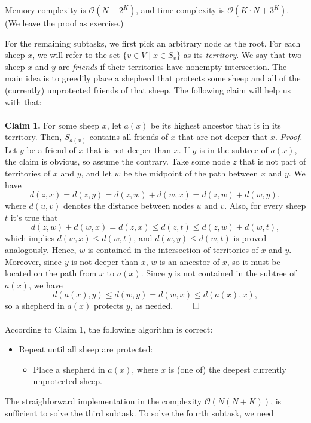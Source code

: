 Memory complexity is $\mathcal{O}(N + 2^K)$, and time complexity is 
$\mathcal{O}(K \cdot N + 3^K)$. (We leave the proof as exercise.) 


For the remaining subtasks, we first pick an arbitrary node as the root.
For each sheep $x$, we will refer to the set $\{v \in V \mid x \in S_v\}$ as its
\textit{territory}. We say that two sheep $x$ and $y$ are \textit{friends} if
their territories have nonempty intersection. The main idea is to greedily place
a shepherd that protects some sheep and all of the (currently) unprotected friends
of that sheep. The following claim will help us with that:
\\\\
\textbf{Claim 1.} For some sheep $x$, let $a(x)$ be its highest ancestor that
is in its territory. Then, $S_{a(x)}$ contains all friends of $x$ that are not
deeper that $x$.
\textit{Proof.} Let $y$ be a friend of $x$ that is not deeper than $x$. If $y$
is in the subtree of $a(x)$, the claim is obvious, so assume the contrary. Take
some node $z$ that is not part of territories of $x$ and $y$, and let $w$ be the
midpoint of the path between $x$ and $y$. We have
$$d(z, x) = d(z, y) = d(z, w) + d(w, x) = d(z, w) + d(w, y),$$ where $d(u, v)$
denotes the distance between nodes $u$ and $v$. Also, for every sheep $t$ it's
true that 
$$d(z, w) + d(w, x) = d(z, x) \leq d(z, t) \leq d(z, w) + d(w, t),$$ which
implies
$d(w, x) \leq d(w, t)$, and $d(w, y) \leq d(w, t)$ is proved analogously.
Hence, $w$ is contained in the intersection of territories of $x$ and $y$.
Moreover, since $y$ is not deeper than $x$, $w$ is an ancestor of $x$, so it
must be located on the path from $x$ to $a(x)$. Since $y$ is not contained in
the subtree of $a(x)$, we have $$d(a(x), y) \leq
d(w, y) = d(w, x) \leq d(a(x), x),$$ so a shepherd in $a(x)$ protects $y$, as
needed. $\qed$
\\\\
According to Claim 1, the following algorithm is correct:
\begin{itemize}
    \item Repeat until all sheep are protected:
    \begin{itemize}
        \item Place a shepherd in $a(x)$, where $x$ is (one of) the deepest
            currently unprotected sheep.
    \end{itemize}
\end{itemize}
The straighforward implementation in the complexity $\mathcal{O}(N(N + K))$,
is sufficient to solve the third subtask. To solve the fourth subtask, we need
